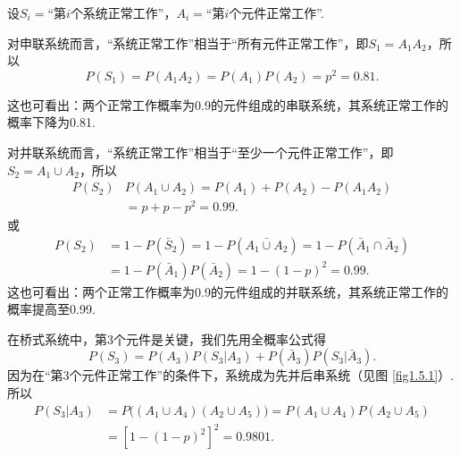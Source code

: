 \begin{solution}
  设$S_i=$“第$i$个系统正常工作”，$A_i=$“第$i$个元件正常工作”.

  \begin{inparaenum}[(1)]
    \item 对申联系统而言，“系统正常工作”相当于“所有元件正常工作”，即$S_1=A_1A_2$，所以
        \[
          P(S_1) = P(A_1A_2) = P(A_1)P(A_2) = p^2 = 0.81.
        \]

        这也可看出：两个正常工作概率为0.9的元件组成的串联系统，其系统正常工作的概率下降为0.81.

    \item 对并联系统而言，“系统正常工作”相当于“至少一个元件正常工作”，即$S_2=A_1\cup A_2$，所以
        \begin{align*}
          P(S_2) & P(A_1\cup A_2) = P(A_1) + P(A_2) - P(A_1A_2) \\
          & = p + p - p^2 = 0.99.
        \end{align*}
        或
        \begin{align*}
          P(S_2) & = 1 - P(\bar S_2) = 1 - P(\bar{A_1\cup A_2}) = 1 - P(\bar A_1\cap \bar A_2) \\
          & = 1 - P(\bar A_1)P(\bar A_2) = 1 - (1-p)^2 = 0.99.
        \end{align*}
        这也可看出：两个正常工作概率为0.9的元件组成的并联系统，其系统正常工作的概率提高至0.99.

        \item 在桥式系统中，第3个元件是关键，我们先用全概率公式得
        \[
          P(S_3) = P(A_3)P(S_3|A_3) + P(\bar A_3)P(S_3|\bar A_3).
        \]
        因为在“第3个元件正常工作”的条件下，系统成为先并后串系统（见图 \ref{fig1.5.1}）. 所以
        \begin{align*}
          P(S_3|A_3) & = P\big( ( A_1\cup A_4 )
          (A_2 \cup A_5) \big) = P(A_1\cup A_4)P(A_2\cup A_5) \\
          & = [ 1 - (1-p)^2 ]^2 = 0.9801.
        \end{align*}


\end{inparaenum}
\end{solution}
